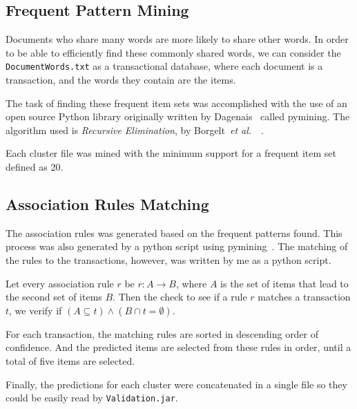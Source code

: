 \documentclass[11pt]{article}
\begin{document}
\subsection{Frequent Pattern Mining}
Documents who share many words are more likely to share other words. In order to be able to efficiently find these commonly shared words, we can consider the \texttt{DocumentWords.txt} as a transactional database, where each document is a transaction, and the words they contain are the items.

The task of finding these frequent item sets was accomplished with the use of an open source Python library originally written by Dagenais~\cite{dagenais10} called pymining. The algorithm used is \emph{Recursive Elimination}, by Borgelt~\emph{et al.}~\cite{borgelt10}~\cite{borgelt05}.

Each cluster file was mined with the minimum support for a frequent item set defined as 20.

\subsection{Association Rules Matching}
The association rules was generated based on the frequent patterns found. This process was also generated by a python script using pymining~\cite{dagenais10}. The matching of the rules to the transactions, however, was written by me as a python script.

Let every association rule $r$ be $r: A \rightarrow B$, where $A$ is the set of items that lead to the second set of items $B$. Then the check to see if a rule $r$ matches a transaction $t$, we verify if $(A \subseteq t) \wedge (B \cap t = \emptyset) $.

For each transaction, the matching rules are sorted in descending order of confidence. And the predicted items are selected from these rules in order, until a total of five items are selected.

Finally, the predictions for each cluster were concatenated in a single file so they could be easily read by \texttt{Validation.jar}.
\end{document}
